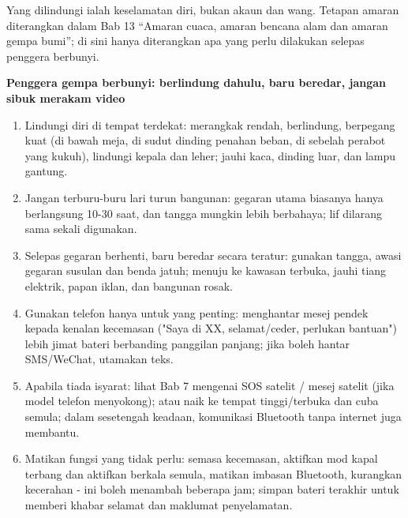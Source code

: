 


Yang dilindungi ialah keselamatan diri, bukan akaun dan wang. Tetapan amaran diterangkan dalam Bab 13 “Amaran cuaca, amaran bencana alam dan amaran gempa bumi”; di sini hanya diterangkan apa yang perlu dilakukan selepas penggera berbunyi.

\textbf{Penggera gempa berbunyi: berlindung dahulu, baru beredar, jangan sibuk merakam video}\par

\begin{enumerate}
  \item Lindungi diri di tempat terdekat: merangkak rendah, berlindung, berpegang kuat (di bawah meja, di sudut dinding penahan beban, di sebelah perabot yang kukuh), lindungi kepala dan leher; jauhi kaca, dinding luar, dan lampu gantung.
  \item Jangan terburu-buru lari turun bangunan: gegaran utama biasanya hanya berlangsung 10-30 saat, dan tangga mungkin lebih berbahaya; lif dilarang sama sekali digunakan.
  \item Selepas gegaran berhenti, baru beredar secara teratur: gunakan tangga, awasi gegaran susulan dan benda jatuh; menuju ke kawasan terbuka, jauhi tiang elektrik, papan iklan, dan bangunan rosak.
  \item Gunakan telefon hanya untuk yang penting: menghantar mesej pendek kepada kenalan kecemasan ("Saya di XX, selamat/ceder, perlukan bantuan") lebih jimat bateri berbanding panggilan panjang; jika boleh hantar SMS/WeChat, utamakan teks.
  \item Apabila tiada isyarat: lihat Bab 7 mengenai SOS satelit / mesej satelit (jika model telefon menyokong); atau naik ke tempat tinggi/terbuka dan cuba semula; dalam sesetengah keadaan, komunikasi Bluetooth tanpa internet juga membantu.
  \item Matikan fungsi yang tidak perlu: semasa kecemasan, aktifkan mod kapal terbang dan aktifkan berkala semula, matikan imbasan Bluetooth, kurangkan kecerahan - ini boleh menambah beberapa jam; simpan bateri terakhir untuk memberi khabar selamat dan maklumat penyelamatan.
\end{enumerate}


